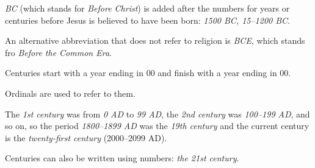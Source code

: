 \documentclass[oneside]{book}
\numberwithin{equation}{section}
\begin{document}
%
\textit{BC} (which stands for \textit{Before Christ}) is added after the numbers for years or centuries before Jesus is believed to have been born: \textit{1500 BC, 15--1200 BC}.

An alternative abbreviation that does not refer to religion is \textit{BCE}, which stands fro \textit{Before the Common Era}.

%
Centuries start with a year ending in 00 and finish with a year ending in 00.

Ordinals are used to refer to them.

The \textit{1st century} was from \textit{0 AD} to \textit{99 AD}, the \textit{2nd century} was \textit{100--199 AD}, and so on, so the period \textit{1800--1899 AD} was the \textit{19th century} and the current century is the \textit{twenty-first century} (2000--2099 AD).

Centuries can also be written using numbers: \textit{the 21st century}.
\end{document}

